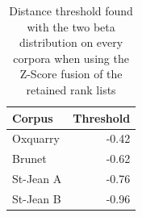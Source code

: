 \begin{table}
  \centering
  \caption{Distance threshold found with the two beta distribution on every corpora when using the Z-Score fusion of the retained rank lists}
  \label{tab:semi_supervised_clustering_thresholds}

  \begin{tabular}{l r}
    \toprule
    Corpus & Threshold \\
    \midrule
    Oxquarry & -0.42 \\
    Brunet & -0.62 \\
    St-Jean A & -0.76 \\
    St-Jean B & -0.96 \\
    \bottomrule
  \end{tabular}
\end{table}

